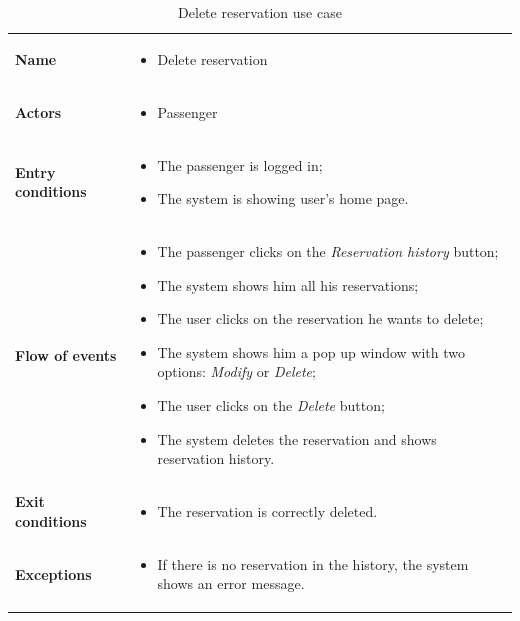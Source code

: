 \begin{table}
\begin{center}
\begin{tabular}{lp{}}
\toprule
\textbf{Name}		&	\begin{itemize}
					\item Delete reservation
					\end{itemize}	\\
\textbf{Actors}		&	\begin{itemize}
					\item Passenger
					\end{itemize}	\\
\textbf{Entry conditions}	&	\begin{itemize}
					\item	The passenger is logged in;
					\item	The system is showing user's home page.
					\end{itemize}	\\
\textbf{Flow of events}	&	\begin{itemize}
					\item	The passenger clicks on the \emph{Reservation history} button;
					\item	The system shows him all his reservations;
					\item	The user clicks on the reservation he wants to delete;
					\item	The system shows him a pop up window with two options: \emph{Modify} or \emph{Delete};
					\item	The user clicks on the \emph{Delete} button;
					\item	The system deletes the reservation and shows reservation history.
					\end{itemize}	\\
\textbf{Exit conditions}	&	\begin{itemize}
					\item	The reservation is correctly deleted.
					\end{itemize}	\\
\textbf{Exceptions}	&	\begin{itemize}
					\item	If there is no reservation in the history, the system shows an error message.
					\end{itemize}	\\
\bottomrule
\end{tabular}
\caption{Delete reservation use case}
\end{center}
\end{table}

